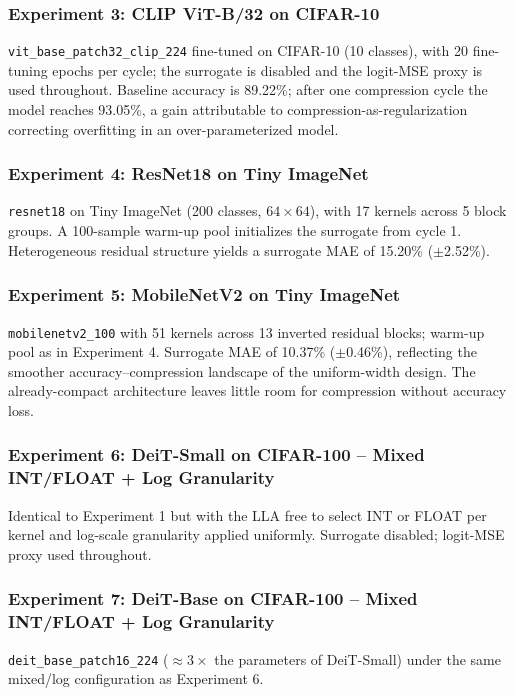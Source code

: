 \documentclass[preprint,12pt,authoryear]{elsarticle}
\begin{document}
\subsubsection*{Experiment 3: CLIP ViT-B/32 on CIFAR-10}
\texttt{vit\_base\_patch32\_clip\_224} \citep{radford2021learning} fine-tuned on CIFAR-10 (10 classes), with 20 fine-tuning epochs per cycle; the surrogate is disabled and the logit-MSE proxy is used throughout. Baseline accuracy is 89.22\%; after one compression cycle the model reaches 93.05\%, a gain attributable to compression-as-regularization correcting overfitting in an over-parameterized model.

\subsubsection*{Experiment 4: ResNet18 on Tiny ImageNet}
\texttt{resnet18} \citep{he2016deep} on Tiny ImageNet (200 classes, $64\times64$), with 17 kernels across 5 block groups. A 100-sample warm-up pool initializes the surrogate from cycle 1. Heterogeneous residual structure yields a surrogate MAE of 15.20\% ($\pm$2.52\%).

\subsubsection*{Experiment 5: MobileNetV2 on Tiny ImageNet}
\texttt{mobilenetv2\_100} \citep{sandler2018mobilenetv2} with 51 kernels across 13 inverted residual blocks; warm-up pool as in Experiment 4. Surrogate MAE of 10.37\% ($\pm$0.46\%), reflecting the smoother accuracy--compression landscape of the uniform-width design. The already-compact architecture leaves little room for compression without accuracy loss.

\subsubsection*{Experiment 6: DeiT-Small on CIFAR-100 -- Mixed INT/FLOAT + Log Granularity}
Identical to Experiment 1 but with the LLA free to select INT or FLOAT per kernel and log-scale granularity applied uniformly. Surrogate disabled; logit-MSE proxy used throughout.

\subsubsection*{Experiment 7: DeiT-Base on CIFAR-100 -- Mixed INT/FLOAT + Log Granularity}
\texttt{deit\_base\_patch16\_224} \citep{touvron2021training} ($\approx3\times$ the parameters of DeiT-Small) under the same mixed/log configuration as Experiment 6.
\end{document}
